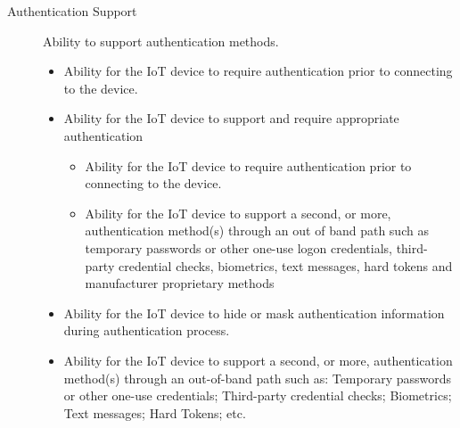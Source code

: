\begin{description}
    \item[Authentication Support] Ability to support authentication methods.
    \begin{itemize}
        \item Ability for the IoT device to require authentication prior to connecting to the device.
        \item Ability for the IoT device to support and require appropriate authentication
        \begin{itemize}
            \item Ability for the IoT device to require authentication prior to connecting to the device.
            \item Ability for the IoT device to support a second, or more, authentication method(s) through an out of band path such as temporary passwords or other one-use logon credentials, third-party credential checks, biometrics, text messages, hard tokens and manufacturer proprietary methods
        \end{itemize}
        \item Ability for the IoT device to hide or mask authentication information during authentication process.
        \item Ability for the IoT device to support a second, or more, authentication method(s) through an out-of-band path such as: Temporary passwords or other one-use credentials; Third-party credential checks; Biometrics; Text messages; Hard Tokens; etc.
    \end{itemize}
    

\end{description}

